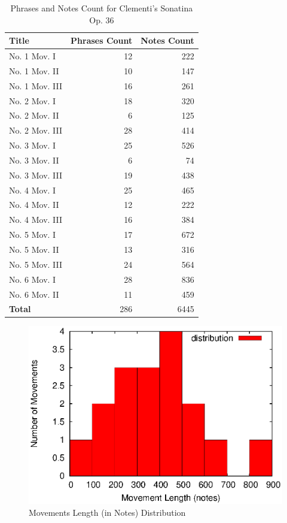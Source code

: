 \begin{table}[bp]
   \centering
   \caption{Phrases and Notes Count for Clementi's Sonatina Op. 36}
   \label{tab:clemcount}
   \begin{tabular}{lrr}
      \hline
      \textbf{Title}&\textbf{Phrases Count}&\textbf{Notes Count}\\
      \hline
      No. 1 Mov. I&12&222\\
      No. 1 Mov. II&10&147\\
      No. 1 Mov. III&16&261\\
      No. 2 Mov. I&18&320\\
      No. 2 Mov. II&6&125\\
      No. 2 Mov. III&28&414\\
      No. 3 Mov. I&25&526\\
      No. 3 Mov. II&6&74\\
      No. 3 Mov. III&19&438\\
      No. 4 Mov. I&25&465\\
      No. 4 Mov. II&12&222\\
      No. 4 Mov. III&16&384\\
      No. 5 Mov. I&17&672\\
      No. 5 Mov. II&13&316\\
      No. 5 Mov. III&24&564\\
      No. 6 Mov. I&28&836\\
      No. 6 Mov. II&11&459\\
      \hline
      \textbf{Total} &286&6445\\
      \hline
   \end{tabular}
\end{table}
\begin{figure}[tp]
   \begin{center}
      \includegraphics[width=\textwidth]{fig/notes}

   \end{center}
   \caption{Movements Length (in Notes) Distribution}
   \label{fig:notes}
\end{figure}
